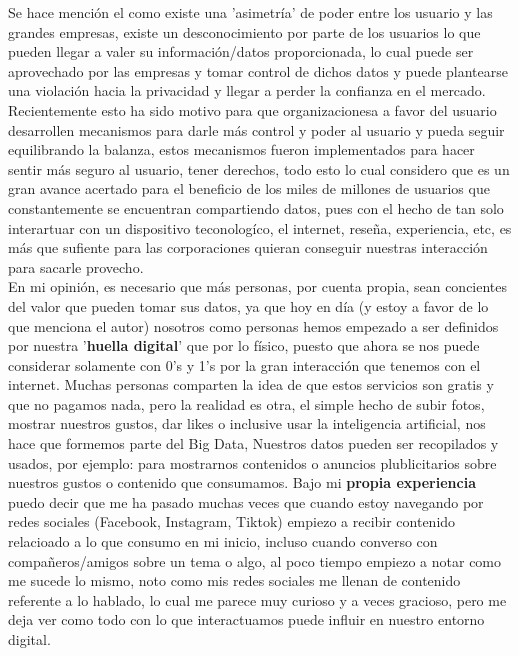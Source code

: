 \documentclass[12pt]{report}
\begin{document}
\begin{enumerate}[label=\textbf{\arabic*.}, leftmargin=*]
\begin{enumerate}[label=\textbf{\alph*.}, leftmargin=*, itemsep=1.0em]
Se hace mención el como existe una 'asimetría' de poder entre los usuario y las grandes empresas, existe un desconocimiento por parte de los usuarios lo que pueden llegar a valer su información/datos proporcionada, lo cual puede ser aprovechado por las empresas y tomar control de dichos datos y puede plantearse una violación hacia la privacidad y llegar a perder la confianza en el mercado. Recientemente esto ha sido motivo para que organizacionesa a favor del usuario desarrollen mecanismos para darle más control y poder al usuario y pueda seguir equilibrando la balanza, estos mecanismos fueron implementados para hacer sentir más seguro al usuario, tener derechos, todo esto lo cual considero que es un gran avance acertado para el beneficio de los miles de millones de usuarios que constantemente se encuentran compartiendo datos, pues con el hecho de tan solo interartuar con un dispositivo teconologíco, el internet, reseña, experiencia, etc, es más que sufiente para las corporaciones quieran conseguir nuestras interacción para sacarle provecho.\\

En mi opinión, es necesario que más personas, por cuenta propia, sean concientes del valor que pueden tomar sus datos, ya que hoy en día (y estoy a favor de lo que menciona el autor) nosotros como personas hemos empezado a ser definidos por nuestra '\textbf{huella digital}' que por lo físico, puesto que ahora se nos puede considerar solamente con 0's y 1's por la gran interacción que tenemos con el internet. Muchas personas comparten la idea de que estos servicios son gratis y que no pagamos nada, pero la realidad es otra, el simple hecho de subir fotos, mostrar nuestros gustos, dar likes o inclusive usar la inteligencia artificial, nos hace que formemos parte del Big Data, Nuestros datos pueden ser recopilados y usados, por ejemplo: para mostrarnos contenidos o anuncios plublicitarios sobre nuestros gustos o contenido que consumamos. Bajo mi \textbf{propia experiencia} puedo decir que me ha pasado muchas veces que cuando estoy navegando por redes sociales (Facebook, Instagram, Tiktok) empiezo a recibir contenido relacioado a lo que consumo en mi inicio, incluso cuando converso con compañeros/amigos sobre un tema o algo, al poco tiempo empiezo a notar como me sucede lo mismo, noto como mis redes sociales me llenan de contenido referente a lo hablado, lo cual me parece muy curioso y a veces gracioso, pero me deja ver como todo con lo que interactuamos puede influir en nuestro entorno digital. \\


\end{enumerate}
\end{enumerate}
\end{document}
